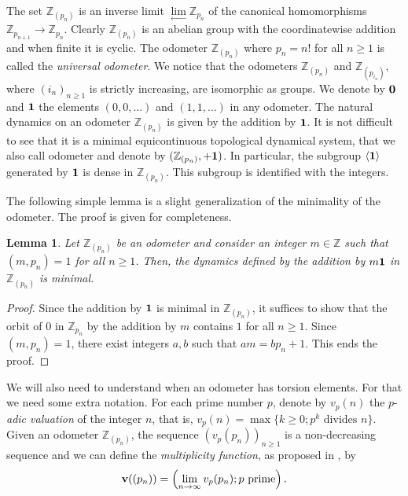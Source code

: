 \documentclass{daj}
\theoremstyle{plain}
\newtheorem{lemma}[theorem]{Lemma}
\theoremstyle{definition}
\begin{document}
The set $\mathbb{Z}_{(p_n)}$ is an inverse limit $\lim\limits_{\leftarrow} \mathbb{Z}_{p_n}$ of the canonical homomorphisms $\mathbb{Z}_{p_{n+1}}\to \mathbb{Z}_{p_n}$.
Clearly $\mathbb{Z}_{(p_n)}$ is an abelian group with the coordinatewise addition and when finite it is cyclic. The odometer $\mathbb{Z}_{(p_n)}$ where $p_{n}=n!$ for all $n\geq 1$ is called the {\em universal odometer}. We notice that the odometers $\mathbb{Z}_{(p_n)}$ and $\mathbb{Z}_{(p_{i_n})}$, where 
$(i_n)_{n\geq 1}$ is strictly increasing, are isomorphic as groups.  
We denote by ${\bf 0}$ and ${\bf 1}$ the elements $(0,0,\ldots)$ and $(1,1,\ldots)$ in any odometer. The natural dynamics on an odometer $\mathbb{Z}_{(p_n)}$ is given by the addition by ${\bf 1}$. It is not difficult to see that it is a minimal equicontinuous topological dynamical system, that we also call odometer and denote by $(\mathbb{Z}_{(p_n)}, +{\bf 1})$. In particular, the subgroup $\langle {\bf 1} \rangle$ generated by ${\bf 1}$ is dense in $\mathbb{Z}_{(p_n)}$. This subgroup is identified with the integers. 

The following simple lemma is a slight generalization of the minimality of the odometer. 
The proof is given for completeness.  

\begin{lemma}\label{lem:generalizedminimality}
	Let $\mathbb{Z}_{(p_n)}$ be an odometer and consider an integer $m\in \mathbb{Z}$ such that 
	$(m,p_n)=1$ for all $n\geq 1$. Then, the dynamics defined by the addition by 
	$m{\bf 1}$ in $\mathbb{Z}_{(p_n)}$ is minimal.
\end{lemma}
\begin{proof}
	Since the addition by $\bf 1$ is minimal in $\mathbb{Z}_{(p_n)}$, it suffices to show that the orbit of $0$ in $\mathbb{Z}_{p_n}$ by the addition by $m$ contains $ 1$ for all $n\geq 1$. 
	Since $(m,p_n)=1$, there exist integers $a,  b$ such that 
	$a m=b  p_n +1$.
	This ends the proof.
\end{proof}

We will also need to understand when an odometer has torsion elements. For that we need some extra notation. For each prime number $p$, denote by $v_{p}(n)$ the $p$-{\em adic valuation} of the integer $n$, that is, $v_{p}(n) = \max \{k\geq 0 ; p^{k} \textrm{ divides } n\}$. 
Given an odometer $\mathbb{Z}_{(p_n)}$, the sequence $(v_{p}(p_{n}))_{n\geq 1}$ is a non-decreasing sequence and we can define the {\em multiplicity function}, as proposed in \cite{Downarowicz:2005}, by 
$$ {\bf v}((p_{n})) = \left ( \lim_{n\to \infty} v_{p}(p_{n}); p \textrm{ prime}  \right ).$$
\end{document}
